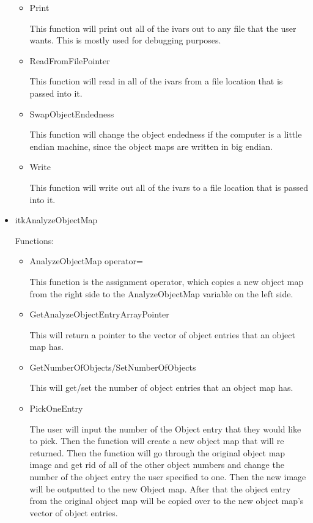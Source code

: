 \documentclass{InsightArticle}
\begin{document}
\begin{itemize}
\begin{itemize}
  \item Print

    This function will print out all of the ivars out to any file that the user wants.  This is mostly used for debugging purposes.

  \item ReadFromFilePointer
    
    This function will read in all of the ivars from a file location that is passed into it.

  \item SwapObjectEndedness

    This function will change the object endedness if the computer is a little endian machine, since the object maps are written in big endian.

  \item Write
  
    This function will write out all of the ivars to a file location that is passed into it.
\end{itemize}

\item itkAnalyzeObjectMap

  Functions:
\begin{itemize}
\item AnalyzeObjectMap operator=

This function is the assignment operator, which copies a new object map from the right side to the AnalyzeObjectMap variable on the left side.

\item GetAnalyzeObjectEntryArrayPointer

This will return a pointer to the vector of object entries that an object map has.

\item GetNumberOfObjects/SetNumberOfObjects

This will get/set the number of object entries that an object map has.

\item PickOneEntry

The user will input the number of the Object entry that they would like to pick.  Then the function will create a new object map that will re returned.  Then the function will go through the original object map image and get rid of all of the other object numbers and change the number of the object entry the user specified to one.  Then the new image will be outputted to the new Object map.  After that the object entry from the original object map will be copied over to the new object map's vector of object entries. 


\end{itemize}
\end{itemize}
\end{document}
